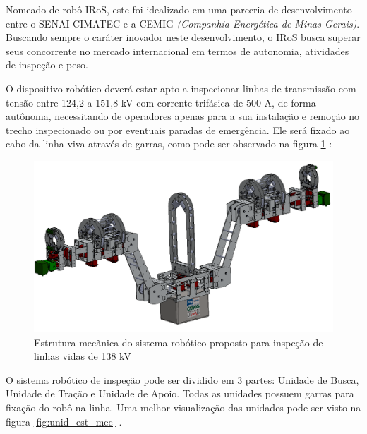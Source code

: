 \documentclass[12pt,oneside,a4paper, chapter=TITLE, section = TITLE, english, brazil]{abntex2}
\begin{document}
Nomeado de robô IRoS, este foi idealizado em uma parceria de desenvolvimento entre o SENAI-CIMATEC e a CEMIG \textit{(Companhia Energética de Minas Gerais)}. Buscando sempre o caráter inovador neste desenvolvimento, o IRoS busca superar seus concorrente no mercado internacional em termos de autonomia, atividades de inspeção e peso.

O dispositivo robótico deverá estar apto a inspecionar linhas de transmissão com tensão entre 124,2 a 151,8 kV com corrente trifásica de 500 A, de forma autônoma, necessitando de operadores apenas para a sua instalação e remoção no trecho inspecionado ou por eventuais paradas de emergência. Ele será fixado ao cabo da linha viva através de garras, como pode ser observado na figura \ref{fig:robo} \cite{cemig}:

\begin{figure}[h] %
\centering
\includegraphics[scale=0.42]{./imagens/robo}
\caption[Estrutura mecãnica do sistema robótico proposto para inspeção de linhas vidas de 138 kV]{Estrutura mecãnica do sistema robótico proposto para inspeção de linhas vidas de 138 kV \cite{cemig}}
\label{fig:robo}
\end{figure}

O sistema robótico de inspeção pode ser dividido em 3 partes: Unidade de Busca, Unidade de Tração e Unidade de Apoio. Todas as unidades possuem garras para fixação do robô na linha. Uma melhor visualização das unidades pode ser visto na figura \ref{fig:unid_est_mec} \cite{cemig}.
\end{document}
